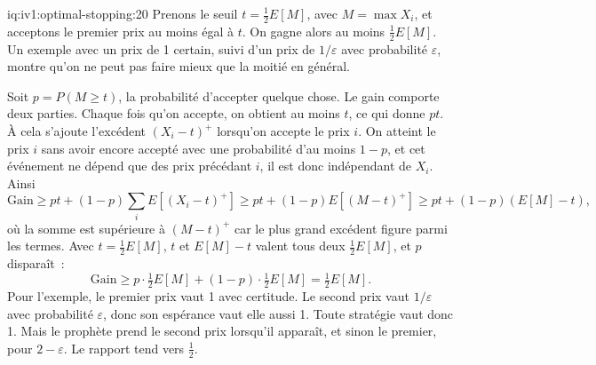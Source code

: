 \begin{solution}{iq:iv1:optimal-stopping:20}
Prenons le seuil $t = \tfrac12 E[M]$, avec $M = \max X_i$, et acceptons le premier prix au moins égal à $t$. On gagne alors au moins $\tfrac12 E[M]$. Un exemple avec un prix de 1 certain, suivi d'un prix de $1/\varepsilon$ avec probabilité $\varepsilon$, montre qu'on ne peut pas faire mieux que la moitié en général.

Soit $p = P(M \ge t)$, la probabilité d'accepter quelque chose. Le gain comporte deux parties. Chaque fois qu'on accepte, on obtient au moins $t$, ce qui donne $pt$. À cela s'ajoute l'excédent $(X_i - t)^+$ lorsqu'on accepte le prix $i$. On atteint le prix $i$ sans avoir encore accepté avec une probabilité d'au moins $1 - p$, et cet événement ne dépend que des prix précédant $i$, il est donc indépendant de $X_i$. Ainsi
\[
\text{Gain} \ge pt + (1 - p)\sum_i E[(X_i - t)^+] \ge pt + (1 - p) E[(M - t)^+] \ge pt + (1 - p)(E[M] - t),
\]
où la somme est supérieure à $(M - t)^+$ car le plus grand excédent figure parmi les termes. Avec $t = \tfrac12 E[M]$, $t$ et $E[M] - t$ valent tous deux $\tfrac12 E[M]$, et $p$ disparaît~:
\[
\text{Gain} \ge p \cdot \tfrac12 E[M] + (1 - p) \cdot \tfrac12 E[M] = \tfrac12 E[M].
\]
Pour l'exemple, le premier prix vaut 1 avec certitude. Le second prix vaut $1/\varepsilon$ avec probabilité $\varepsilon$, donc son espérance vaut elle aussi 1. Toute stratégie vaut donc 1. Mais le prophète prend le second prix lorsqu'il apparaît, et sinon le premier, pour $2 - \varepsilon$. Le rapport tend vers $\tfrac12$.

\end{solution}
